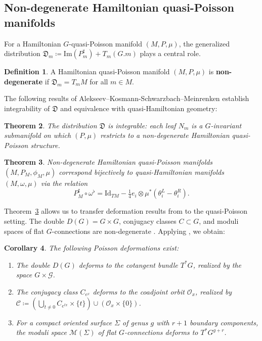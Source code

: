 \documentclass[reqno]{amsart}
\theoremstyle{plain}
\newtheorem{Thm}{Theorem}[section]
\newtheorem{Cor}[Thm]{Corollary}
\theoremstyle{definition}
\newtheorem{Def}[Thm]{Definition}
\begin{document}
\subsection{Non-degenerate Hamiltonian quasi-Poisson manifolds}\label{non-degen}

For a Hamiltonian $G$-quasi-Poisson manifold $(M,P,\mu)$, the generalized distribution $\mathfrak{D}_{m} \coloneqq \mathrm{Im}(P_{m}^{\sharp}) + T_{m}(G.m)$ plays a central role.

\begin{Def}
A Hamiltonian quasi-Poisson manifold $(M,P,\mu)$ is \textbf{non-degenerate} if $\mathfrak{D}_{m} = T_{m}M$ for all $m\in M$.
\end{Def}

The following results of Alekseev--Kosmann-Schwarzbach--Meinrenken establish integrability of $\mathfrak{D}$ and equivalence with quasi-Hamiltonian geometry:

\begin{Thm}\cite[]{alekseev2002quasi}\label{thm:integrability}
The distribution $\mathfrak{D}$ is integrable: each leaf $N_{m}$ is a $G$-invariant submanifold on which $(P,\mu)$ restricts to a non-degenerate Hamiltonian quasi-Poisson structure.
\end{Thm}

\begin{Thm}\cite[]{alekseev2002quasi} \label{equivalence}
Non-degenerate Hamiltonian quasi-Poisson manifolds $(M,P_{M},\phi_{M},\mu)$ correspond bijectively to quasi-Hamiltonian manifolds $(M,\omega,\mu)$ via the relation
\begin{equation} \label{eq 1}
P_{M}^{\sharp}\circ \omega^{\flat} = \mathrm{Id}_{TM} - \tfrac{1}{4}e_{i}\otimes \mu^{*}(\theta^{L}_{i} - \theta^{R}_{i}).
\end{equation}
\end{Thm}

Theorem~\ref{equivalence} allows us to transfer deformation results from \cite{JMM2025deformations} to the quasi-Poisson setting. The double $D(G) = G\times G$, conjugacy classes $C \subset G$, and moduli spaces of flat $G$-connections are non-degenerate \cite{alekseev2002quasi}. Applying \cite[Theorems~4.1, 4.2, Corollary~4.3]{JMM2025deformations}, we obtain:

\begin{Cor}\label{cor:main-examples}
The following Poisson deformations exist:
\begin{enumerate}
\item The double $D(G)$ deforms to the cotangent bundle $T^{*}G$, realized by the space $G\times \mathcal{G}$.
\item The conjugacy class $C_{e^{x}}$ deforms to the coadjoint orbit $\mathcal{O}_x$, realized by $\mathcal{C}\coloneqq \left(\bigcup_{t\neq 0} C_{e^{tx}}\times \{t\}\right) \cup \left(\mathcal{O}_{x}\times \{0\}\right)$.
\item For a compact oriented surface $\Sigma$ of genus $g$ with $r+1$ boundary components, the moduli space $\mathcal{M}(\Sigma)$ of flat $G$-connections deforms to $T^{*}G^{g+r}$.
\end{enumerate}
\end{Cor}
\end{document}
